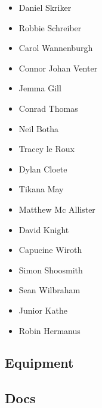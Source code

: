 \documentclass[10pt]{article}
\begin{document}
\begin{minipage}{\linewidth}
\begin{multicols}{2}
\begin{itemize}
			\item Daniel Skriker
			\item Robbie Schreiber
			\item Carol Wannenburgh
			\item Connor Johan Venter
			\item Jemma Gill
			\item Conrad Thomas
			\item Neil Botha
			\item Tracey le Roux
			\item Dylan Cloete
			\item Tikana May
			\item Matthew Mc Allister
			\item David Knight
			\item Capucine Wiroth
			\item Simon Shoosmith
			\item Sean Wilbraham
			\item Junior Kathe
			\item Robin Hermanus
		\end{itemize}
	\columnbreak
	\subsection*{\faWrench \: Equipment}
	        \vfill\null
        \subsection*{\faFile \: Docs}
     	\end{multicols}


	\vspace{1cm}
	\end{minipage}

	
\end{document}

